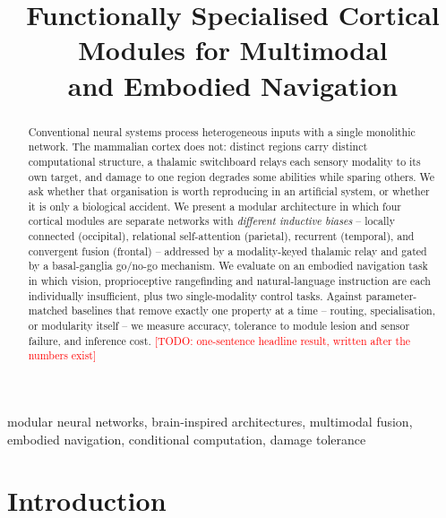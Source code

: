 \documentclass[conference]{IEEEtran}
\newcommand{\todo}[1]{\textcolor{red}{[TODO: #1]}}
\begin{document}
\title{Functionally Specialised Cortical Modules for Multimodal\\
       and Embodied Navigation}

\author{
\IEEEauthorblockA{\textit{\todo{affiliation}} \\
\todo{city, country} \\
chakrabortyrishiraj09@gmail.com}}

\maketitle

\begin{abstract}
Conventional neural systems process heterogeneous inputs with a single
monolithic network. The mammalian cortex does not: distinct regions carry
distinct computational structure, a thalamic switchboard relays each sensory
modality to its own target, and damage to one region degrades some abilities
while sparing others. We ask whether that organisation is worth reproducing in
an artificial system, or whether it is only a biological accident.
%
We present a modular architecture in which four cortical modules are separate
networks with \emph{different inductive biases} -- locally connected
(occipital), relational self-attention (parietal), recurrent (temporal), and
convergent fusion (frontal) -- addressed by a modality-keyed thalamic relay and
gated by a basal-ganglia go/no-go mechanism. We evaluate on an embodied
navigation task in which vision, proprioceptive rangefinding and natural-language
instruction are each individually insufficient, plus two single-modality
control tasks.
%
Against parameter-matched baselines that remove exactly one property at a time
-- routing, specialisation, or modularity itself -- we measure accuracy,
tolerance to module lesion and sensor failure, and inference cost.
\todo{one-sentence headline result, written after the numbers exist}
\end{abstract}

\begin{IEEEkeywords}
modular neural networks, brain-inspired architectures, multimodal fusion,
embodied navigation, conditional computation, damage tolerance
\end{IEEEkeywords}

\section{Introduction}
\end{document}
